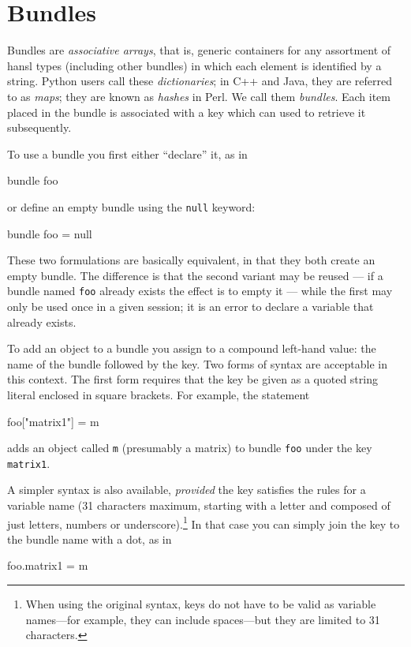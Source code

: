 \chapter{Bundles}
\label{chap:bundles}

Bundles are \emph{associative arrays}, that is, generic containers for
any assortment of hansl types (including other bundles) in which each
element is identified by a string. Python users call these
\emph{dictionaries}; in C++ and Java, they are referred to as
\emph{maps}; they are known as \emph{hashes} in Perl. We call them
\emph{bundles}. Each item placed in the bundle is associated with a
key which can used to retrieve it subsequently.

To use a bundle you first either ``declare'' it, as in
%
\begin{code}
bundle foo
\end{code}
%
or define an empty bundle using the \texttt{null} keyword:
%
\begin{code}
bundle foo = null
\end{code}
%
These two formulations are basically equivalent, in that they both
create an empty bundle. The difference is that the second variant
may be reused --- if a bundle named \texttt{foo} already exists the
effect is to empty it --- while the first may only be used once in
a given  session; it is an error to declare a variable that
already exists. 

To add an object to a bundle you assign to a compound left-hand value:
the name of the bundle followed by the key. Two forms of syntax are
acceptable in this context. The first form requires that the key be
given as a quoted string literal enclosed in square brackets.  For
example, the statement
\begin{code}
foo["matrix1"] = m
\end{code}
adds an object called \texttt{m} (presumably a matrix) to bundle
\texttt{foo} under the key \texttt{matrix1}. 

A simpler syntax is also available, \emph{provided} the key satisfies
the rules for a  variable name (31 characters maximum,
starting with a letter and composed of just letters, numbers or
underscore).\footnote{When using the original syntax, keys do not have
  to be valid as variable names---for example, they can include
  spaces---but they are limited to 31 characters.}  In that case you
can simply join the key to the bundle name with a dot, as in

\begin{code}
foo.matrix1 = m
\end{code}

